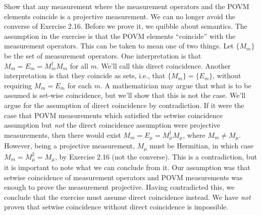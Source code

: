  Show that any measurement where the measurement operators and the POVM elements coincide is a projective measurement. 
\Soln We can no longer avoid the converse of Exercise 2.16.  Before we prove it, we quibble about semantics.  The assumption in the exercise is that the POVM elements ``coincide'' with the measurement operators.  This can be taken to mean one of two things.  Let $\{M_m\}$ be the set of measurement operators.  One interpretation is that $M_m = E_m = M_m^\dagger M_m$ for all $m$.  We'll call this direct coincidence.  Another interpretation is that they coincide as sets, i.e., that $\{M_m\} = \{E_m\}$, without requiring $M_m = E_m$ for each $m$.  A mathematician may argue that what is to be assumed is set-wise coincidence, but we'll show that this is not the case.  We'll argue for the assumption of direct coincidence by contradiction.  If it were the case that POVM measurements which satisfied the setwise coincidence assumption but {\em not} the direct coincidence assumption were projective measurements, then there would exist $M_m=E_\mu = M_\mu^\dagger M_\mu$, where $M_m \neq M_\mu$.  However, being a projective measurement, $M_\mu$ must be Hermitian, in which case $M_m = M_\mu^2 =M_\mu$, by Exercise 2.16 (not the converse).  This is a contradiction, but it is important to note what we can conclude from it.  Our assumption was that setwise coincidence of measurement operators and POVM measurements was enough to prove the measurement projective.  Having contradicted this, we conclude that the exercise must assume direct coincidence instead.  We have {\em not} proven that setwise coincidence without direct coincidence is impossible.
